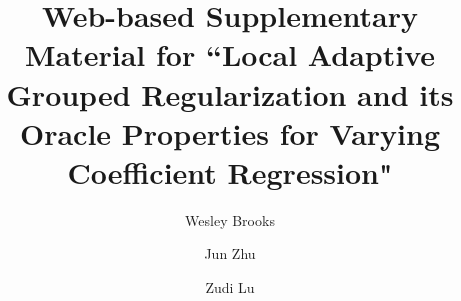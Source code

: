 \documentclass[authoryear,review, 12pt]{elsarticle}
\begin{document}
\begin{frontmatter}

\title{Web-based Supplementary Material for ``Local Adaptive Grouped Regularization and its Oracle Properties for Varying Coefficient Regression"}


\author[wrbrooks]{Wesley Brooks}

\author[jzhu]{Jun Zhu}

\author[zlu]{Zudi Lu}

\address[wrbrooks]{Department of Statistics, University of Wisconsin, Madison, WI 53706}
\address[jzhu]{Department of Statistics and Department of Entomology, University of Wisconsin, Madison, WI 53706}
\address[zlu]{School of Mathematical Sciences, The University of Southampton, Highfield, Southampton UK}

\end{frontmatter}
\end{document}
